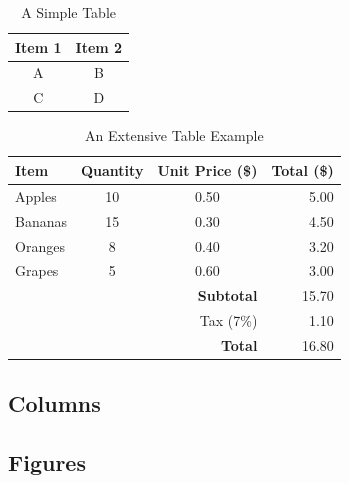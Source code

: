 \documentclass{article}
\begin{document}
\begin{table}[h]
\centering
\begin{tabular}{|c|c|}
\hline
Item 1 & Item 2 \\
\hline
A & B \\
C & D \\
\hline
\end{tabular}
\caption{A Simple Table}
\end{table}

\begin{table}[h]
  \centering
  \begin{tabular}{lccr}
    \toprule
    \textbf{Item} & \textbf{Quantity} & \textbf{Unit Price (\$)} & \textbf{Total (\$)} \\
    \midrule
    Apples        & 10                & 0.50                     & 5.00               \\
    Bananas       & 15                & 0.30                     & 4.50               \\
    Oranges       & 8                 & 0.40                     & 3.20               \\
    Grapes        & 5                 & 0.60                     & 3.00               \\
    \midrule
    \multicolumn{3}{r}{\textbf{Subtotal}}                            & 15.70              \\
    \multicolumn{3}{r}{Tax (7\%)}                                    & 1.10               \\
    \midrule
    \multicolumn{3}{r}{\textbf{Total}}                               & 16.80              \\
    \bottomrule
  \end{tabular}
  \caption{An Extensive Table Example}
\end{table}

\subsection{Columns}

\begin{multicols}{2}
\lipsum[1]
\end{multicols}

\subsection{Figures}
\end{document}
